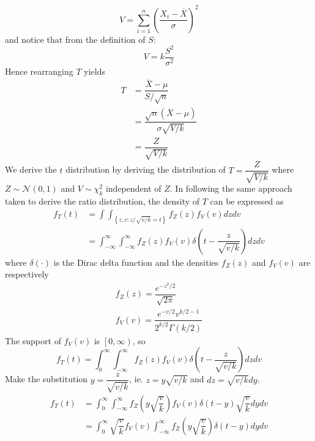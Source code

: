 \documentclass[11pt]{report} %
\begin{document}
\begin{equation}
V = \sum_{i=1}^{n}\left(\dfrac{X_{i}-\overline{X}}{\sigma}\right)^{2}
\end{equation}
and notice that from the definition of $S$:
\begin{equation}
V = k\dfrac{S^{2}}{\sigma^{2}}
\end{equation}
Hence rearranging $T$ yields
\begin{align}
T &= \dfrac{\overline{X} - \mu}{S/\sqrt{n}} \\
&= \dfrac{\sqrt{n}\left(\overline{X} - \mu\right)}{\sigma\sqrt{V/k}} \\
&= \dfrac{Z}{\sqrt{V/k}}
\end{align}
We derive the $t$ distribution by deriving the distribution of $T = \dfrac{Z}{\sqrt{V/k}}$ where $Z\sim\mathcal{N}\left(0, 1\right)$ and $V\sim\chi_{k}^{2}$ independent of $Z$. In following the same approach taken to derive the ratio distribution, the density of $T$ can be expressed as
\begin{align}
f_{T}\left(t\right) &= \int\int_{\left\{ z,v:z/\sqrt{v/k}=t\right\} }f_{Z}\left(z\right)f_{V}\left(v\right)dzdv \\
&= \int_{-\infty}^{\infty}\int_{-\infty}^{\infty}f_{Z}\left(z\right)f_{V}\left(v\right)\delta\left(t-\dfrac{z}{\sqrt{v/k}}\right)dzdv
\end{align}
where $\delta\left(\cdot\right)$ is the Dirac delta function and the densities $f_{Z}\left(z\right)$ and $f_{V}\left(v\right)$ are respectively
\begin{gather}
f_{Z}\left(z\right)=\dfrac{e^{-z^{2}/2}}{\sqrt{2\pi}} \\
f_{V}\left(v\right)=\dfrac{e^{-v/2}v^{k/2-1}}{2^{k/2}\Gamma\left(k/2\right)}
\end{gather}
The support of $f_{V}\left(v\right)$ is $\left[0, \infty\right)$, so
\begin{equation}
f_{T}\left(t\right)=\int_{0}^{\infty}\int_{-\infty}^{\infty}f_{Z}\left(z\right)f_{V}\left(v\right)\delta\left(t-\dfrac{z}{\sqrt{v/k}}\right)dzdv
\end{equation}
Make the substitution $y = \dfrac{z}{\sqrt{v/k}}$, ie. $z = y\sqrt{v/k}$ and $dz = \sqrt{v/k}dy$.
\begin{align}
f_{T}\left(t\right) &= \int_{0}^{\infty}\int_{-\infty}^{\infty}f_{Z}\left(y\sqrt{\dfrac{v}{k}}\right)f_{V}\left(v\right)\delta\left(t-y\right)\sqrt{\dfrac{v}{k}}dydv \\
&= \int_{0}^{\infty}\sqrt{\dfrac{v}{k}}f_{V}\left(v\right)\int_{-\infty}^{\infty}f_{Z}\left(y\sqrt{\dfrac{v}{k}}\right)\delta\left(t-y\right)dydv
\end{align}
\end{document}
